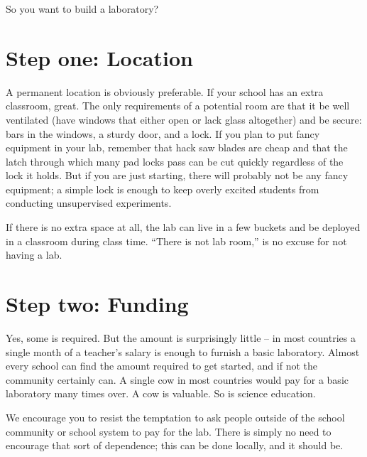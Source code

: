 So you want to build a laboratory?

\section{Step one: Location}
A permanent location is obviously preferable. 
If your school has an extra classroom, 
great. 
The only requirements of a potential room are 
that it be well ventilated 
(have windows that either open or lack glass altogether) 
and be secure: bars in the windows, 
a sturdy door, 
and a lock. 
If you plan to put fancy equipment in your lab, 
remember that hack saw blades are cheap 
and that the latch through which many pad locks pass 
can be cut quickly regardless of the lock it holds. 
But if you are just starting, 
there will probably not be any fancy equipment; 
a simple lock is enough to keep overly excited students 
from conducting unsupervised experiments.

If there is no extra space at all, 
the lab can live in a few buckets and be deployed in a classroom 
during class time. 
“There is not lab room,” is no excuse for not having a lab.

\section{Step two: Funding}
Yes, 
some is required. 
But the amount is surprisingly little – 
in most countries a single month of a teacher’s salary 
is enough to furnish a basic laboratory. 
Almost every school can find the amount required to get started, 
and if not the community certainly can. 
A single cow in most countries would pay 
for a basic laboratory many times over. 
A cow is valuable. 
So is science education.

We encourage you to resist the temptation 
to ask people outside of the school community or school system 
to pay for the lab. 
There is simply no need to encourage that sort of dependence; 
this can be done locally, and it should be.
